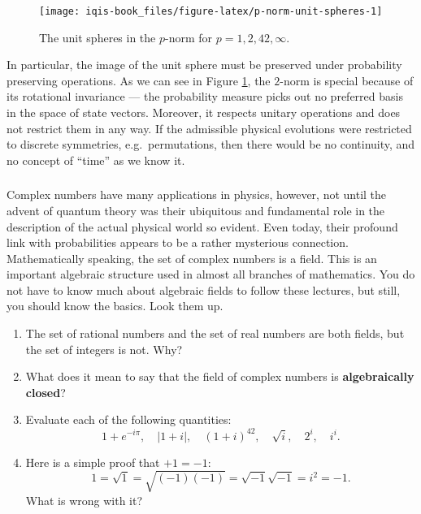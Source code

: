 \documentclass[fleqn]{article}
\providecommand{\tightlist}{%
  \setlength{\itemsep}{0pt}\setlength{\parskip}{0pt}}
\begin{document}
\begin{figure}[H]

{\centering \texttt{[image: iqis-book\_files/figure-latex/p-norm-unit-spheres-1]} 

}

\caption{The unit spheres in the \(p\)-norm for \(p=1,2,42,\infty\).}\label{fig:p-norm-unit-spheres}
\end{figure}

In particular, the image of the unit sphere must be preserved under probability preserving operations.
As we can see in Figure \ref{fig:p-norm-unit-spheres}, the \(2\)-norm is special because of its rotational invariance --- the probability measure picks out no preferred basis in the space of state vectors.
Moreover, it respects unitary operations and does not restrict them in any way.
If the admissible physical evolutions were restricted to discrete symmetries, e.g.~permutations, then there would be no continuity, and no concept of ``time'' as we know it.

\hypertarget{section-2}{%
\subsubsection{}\label{section-2}}

Complex numbers have many applications in physics, however, not until the advent of quantum theory was their ubiquitous and fundamental role in the description of the actual physical world so evident.
Even today, their profound link with probabilities appears to be a rather mysterious connection.
Mathematically speaking, the set of complex numbers is a field. This is an important algebraic structure used in almost all branches of mathematics.
You do not have to know much about algebraic fields to follow these lectures, but still, you should know the basics.
Look them up.

\begin{enumerate}
\def\labelenumi{\alph{enumi}.}
\tightlist
\item
  The set of rational numbers and the set of real numbers are both fields, but the set of integers is not. Why?
\item
  What does it mean to say that the field of complex numbers is \textbf{algebraically closed}?
\item
  Evaluate each of the following quantities:
  \[
   1+e^{-i\pi},
   \quad
   |1+i|,
   \quad
   (1+i)^{42},
   \quad
   \sqrt{i},
   \quad
   2^i,
   \quad
   i^i.
    \]
\item
  Here is a simple proof that \(+1=-1\): \[1=\sqrt{1}=\sqrt{(-1)(-1)}=\sqrt{-1}\sqrt{-1}=i^2=-1.\] What is wrong with it?
\end{enumerate}
\end{document}
